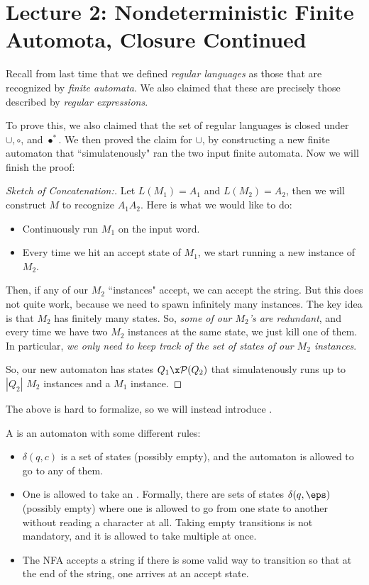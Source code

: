 \section*{Lecture 2: Nondeterministic Finite Automota, Closure Continued}
\setcounter{section}{2}
\setcounter{subsection}{0}
\setcounter{defn}{0}
\setcounter{defncontainer}{0}

Recall from last time that we defined \emph{regular languages} as those that are recognized by \emph{finite automata}. 
We also claimed that these are precisely those described by \emph{regular expressions}.

To prove this, we also claimed that the set of regular languages is closed under $\cup, \circ$, and ${\bullet}^*$.
We then proved the claim for $\cup$, by constructing a new finite automaton that ``simulatenously" ran the two input finite automata.
Now we will finish the proof:

\begin{proof}
	[Sketch of Concatenation:]
	Let $L(M_1) = A_1$ and $L(M_2) = A_2$, then we will construct $M$ to recognize $A_1A_2$. Here is what we would like to do:
	\begin{itemize}
		\item Continuously run $M_1$ on the input word. 
		\item Every time we hit an accept state of $M_1$, we start running a new instance of $M_2$.
	\end{itemize}
	Then, if any of our $M_2$ ``instances" accept, we can accept the string. But this does not quite work, because we need to spawn infinitely many instances. The key idea is that $M_2$ has finitely many states. So, \emph{some of our $M_2$'s are redundant}, and every time we have two $M_2$ instances at the same state, we just kill one of them. In particular, \emph{we only need to keep track of the set of states of our $M_2$ instances}.

	So, our new automaton has states $Q_1\x \mathcal P(Q_2)$ that simulatenously runs up to $|Q_2|$ $M_2$ instances and a $M_1$ instance. 
\end{proof}

The above is hard to formalize, so we will instead introduce .

\begin{defn}
	A  is an automaton with some different rules:
	\begin{itemize}
		\item $\delta(q, c)$ is a set of states (possibly empty), and the automaton is allowed to go to any of them. 
		\item One is allowed to take an . Formally, there are sets of states $\delta(q, \eps)$ (possibly empty) where one is allowed to go from one state to another without reading a character at all. Taking empty transitions is not mandatory, and it is allowed to take multiple at once.
		\item The NFA accepts a string if there is some valid way to transition so that at the end of the string, one arrives at an accept state.
	\end{itemize}
\end{defn}

